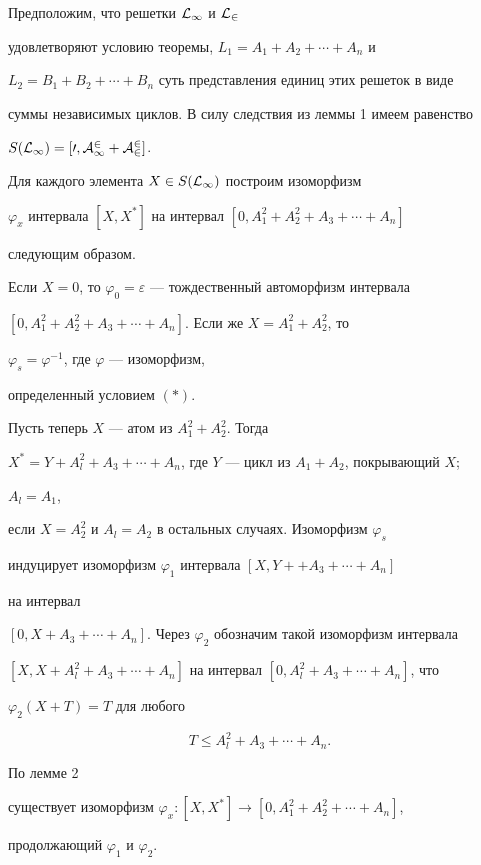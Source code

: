 \begin{pf}


Предположим, что решетки $\cal L_1$ и $\cal L_2$


удовлетворяют условию теоремы, $L_1=A_1+A_2+\dotsb+A_n$ и


$L_2=B_1+B_2+\dotsb+B_n$ суть представления единиц этих решеток в виде


суммы независимых циклов. В силу следствия из леммы 1 имеем равенство


$S(\cal L_1)=[0,A_1^2+A_2^2]$.





Для каждого элемента $X \in S(\cal L_1)$ построим изоморфизм


$\varphi_x$ интервала $[X,X^*]$ на интервал $[0,A_1^2+A_2^2+A_3+\dotsb+A_n]$


следующим образом.


Если $X=0$, то $\varphi_0=\varepsilon$ --- тождественный автоморфизм интервала


$[0,A_1^2+A_2^2+A_3+\dotsb+A_n]$. Если же $X=A_1^2+A_2^2$, то


$\varphi_s=\varphi^{-1}$, где $\varphi$ --- изоморфизм,


определенный условием $(\ast)$.


Пусть теперь $X$ --- атом из $A_1^2+A_2^2$. Тогда


$X^*=Y+A_l^2+A_3+\dotsb+A_n$, где $Y$ --- цикл из $A_1+A_2$, покрывающий $X$;


$A_l=A_1$,


если $X=A_2^2$ и $A_l=A_2$ в остальных случаях. Изоморфизм $\varphi_s$


индуцирует изоморфизм $\varphi_1$ интервала $[X,Y+ +A_3+\dotsb+A_n]$


на интервал


$[0,X+A_3+\dotsb+A_n]$. Через $\varphi_2$ обозначим такой изоморфизм интервала


$[X,X+A_l^2+A_3+\dotsb+A_n]$ на интервал $[0,A_l^2+A_3+\dotsb+A_n]$, что


$\varphi_2(X+T)=T$ для любого


$$


T \leq A_l^2+A_3+\dotsb+A_n.


$$


По лемме 2


существует изоморфизм $\varphi_x :[X,X^*] \to [0,A_1^2+A_2^2+\dotsb+A_n]$,


продолжающий $\varphi_1$ и $\varphi_2$.






\end{pf}

